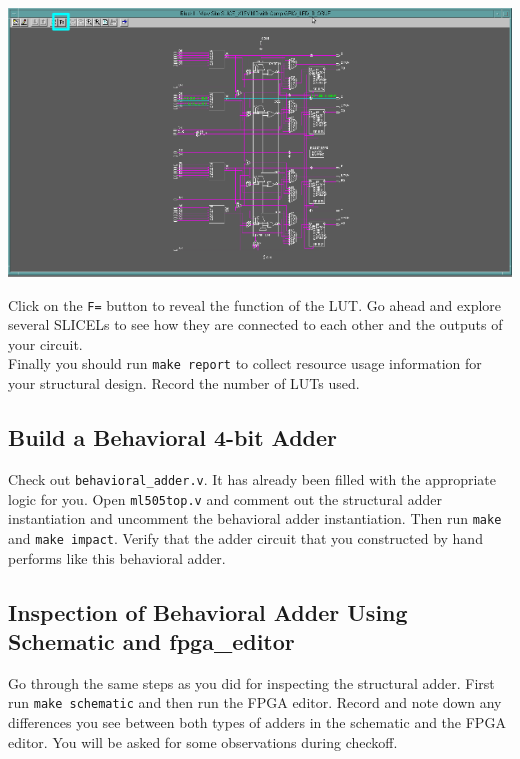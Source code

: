 \documentclass[11pt]{article}
\begin{document}
\begin{center}
	\includegraphics[width=\textwidth]{images/fpga_editor_2.png}
\end{center}

Click on the \verb|F=| button to reveal the function of the LUT. Go ahead and explore several SLICELs to see how they are connected to each other and the outputs of your circuit.\\

Finally you should run \verb|make report| to collect resource usage information for your structural design. Record the number of LUTs used.

\subsection{Build a Behavioral 4-bit Adder}

Check out \verb|behavioral_adder.v|. It has already been filled with the appropriate logic for you. Open \verb|ml505top.v| and comment out the structural adder instantiation and uncomment the behavioral adder instantiation. Then run \verb|make| and \verb|make impact|. Verify that the adder circuit that you constructed by hand performs like this behavioral adder.

\subsection{Inspection of Behavioral Adder Using Schematic and fpga\_editor}

Go through the same steps as you did for inspecting the structural adder. First run \verb|make schematic| and then run the FPGA editor. Record and note down any differences you see between both types of adders in the schematic and the FPGA editor. You will be asked for some observations during checkoff.
\end{document}
